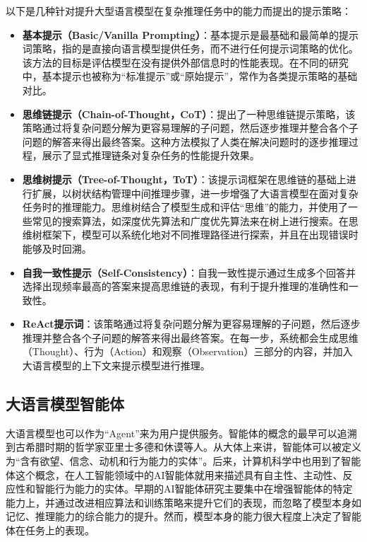 以下是几种针对提升大型语言模型在复杂推理任务中的能力而提出的提示策略：

\begin{itemize}
    \item \textbf{基本提示（Basic/Vanilla Prompting）}：基本提示是最基础和最简单的提示词策略，指的是直接向语言模型提供任务，而不进行任何提示词策略的优化。该方法的目标是评估模型在没有提供外部信息时的性能表现。在不同的研究中，基本提示也被称为“标准提示”或“原始提示”，常作为各类提示策略的基础对比。
    \item \textbf{思维链提示（Chain-of-Thought，CoT）}：\cite{Wang2023a}提出了一种思维链提示策略，该策略通过将复杂问题分解为更容易理解的子问题，然后逐步推理并整合各个子问题的解答来得出最终答案。这种方法模拟了人类在解决问题时的逐步推理过程，展示了显式推理链条对复杂任务的性能提升效果。
    \item \textbf{思维树提示（Tree-of-Thought，ToT）}：该提示词框架在思维链的基础上进行扩展，以树状结构管理中间推理步骤，进一步增强了大语言模型在面对复杂任务时的推理能力。思维树结合了模型生成和评估“思维”的能力，并使用了一些常见的搜索算法，如深度优先算法和广度优先算法来在树上进行搜索。在思维树框架下，模型可以系统化地对不同推理路径进行探索，并且在出现错误时能够及时回溯。
    \item \textbf{自我一致性提示（Self-Consistency）}：自我一致性提示通过生成多个回答并选择出现频率最高的答案来提高思维链的表现，有利于提升推理的准确性和一致性。
    \item \textbf{ReAct提示词}：该策略通过将复杂问题分解为更容易理解的子问题，然后逐步推理并整合各个子问题的解答来得出最终答案。在每一步，系统都会生成思维（Thought）、行为（Action）和观察（Observation）三部分的内容，并加入大语言模型的上下文来提示模型进行推理。
\end{itemize}

\subsection{大语言模型智能体}

大语言模型也可以作为“Agent”来为用户提供服务。智能体的概念的最早可以追溯到古希腊时期的哲学家亚里士多德和休谟等人\cite{Zalta2019}。从大体上来讲，智能体可以被定义为“含有欲望、信念、动机和行为能力的实体”\cite{Xi2023}。后来，计算机科学中也用到了智能体这个概念，在人工智能领域中的AI智能体就用来描述具有自主性、主动性、反应性和智能行为能力的实体\cite{Wooldridge1995}。早期的AI智能体研究主要集中在增强智能体的特定能力上\cite{Sutton2018}，并通过改进相应算法和训练策略来提升它们的表现，而忽略了模型本身如记忆、推理能力的综合能力的提升。然而，模型本身的能力很大程度上决定了智能体在任务上的表现。

